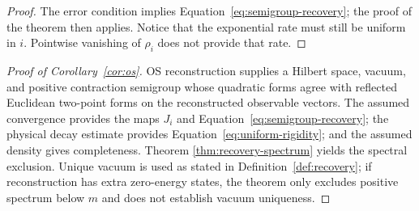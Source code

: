 \begin{proof}
The error condition implies Equation~\eqref{eq:semigroup-recovery}; the proof
of the theorem then applies.  Notice that the exponential rate must still be
uniform in $i$.  Pointwise vanishing of $\rho_i$ does not provide that rate.
\end{proof}

\begin{proof}[Proof of Corollary~\ref{cor:os}]
OS reconstruction supplies a Hilbert space, vacuum, and positive contraction
semigroup whose quadratic forms agree with reflected Euclidean two-point
forms on the reconstructed observable vectors.  The assumed convergence
provides the maps $J_i$ and Equation~\eqref{eq:semigroup-recovery}; the
physical decay estimate provides Equation~\eqref{eq:uniform-rigidity}; and
the assumed density gives completeness.  Theorem
\ref{thm:recovery-spectrum} yields the spectral exclusion.  Unique vacuum is
used as stated in Definition~\ref{def:recovery}; if reconstruction has extra
zero-energy states, the theorem only excludes positive spectrum below $m$ and
does not establish vacuum uniqueness.
\end{proof}
